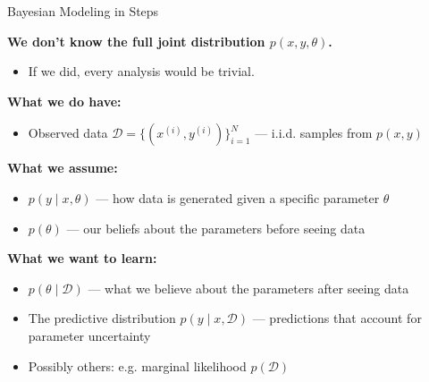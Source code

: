 \documentclass{beamer}
\begin{document}
\begin{frame}{Bayesian Modeling in Steps}

\textbf{We don’t know the full joint distribution $p(x, y, \theta)$.}
\begin{itemize}
  \item If we did, every analysis would be trivial.
\end{itemize}

\vspace{0.3cm}
\textbf{What we do have:}
\begin{itemize}
  \item Observed data $\mathcal{D} = \{(x^{(i)}, y^{(i)})\}_{i=1}^N$ — i.i.d. samples from $p(x, y)$
\end{itemize}

\vspace{0.3cm}
\textbf{What we assume:}
\begin{itemize}
  \item $p(y \mid x, \theta)$ — how data is generated given a specific parameter $\theta$
  \item $p(\theta)$ — our beliefs about the parameters before seeing data
\end{itemize}

\vspace{0.3cm}
\textbf{What we want to learn:}
\begin{itemize}
  \item $p(\theta \mid \mathcal{D})$ — what we believe about the parameters after seeing data
  \item The predictive distribution $p(y \mid x, \mathcal{D})$ — predictions that account for parameter uncertainty
  \item Possibly others: e.g. marginal likelihood $p(\mathcal{D})$
\end{itemize}

\end{frame}
\end{document}
